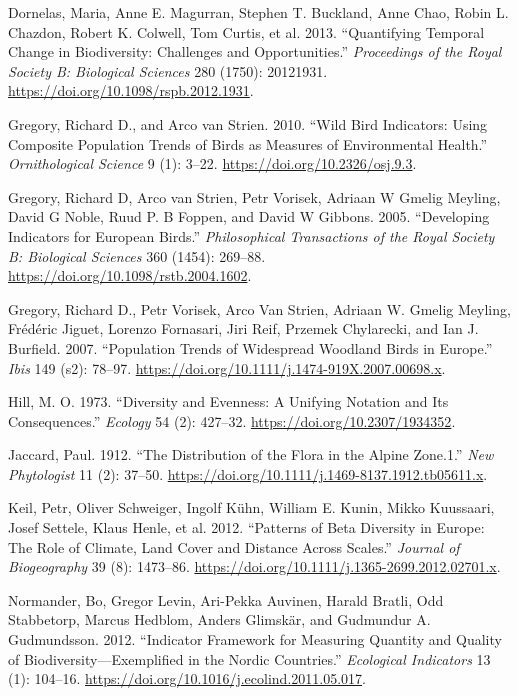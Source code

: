 \documentclass[
  12pt,
  oneside]{report}
\begin{document}
\leavevmode\hypertarget{ref-dornelas_quantifying_2013}{}%
Dornelas, Maria, Anne E. Magurran, Stephen T. Buckland, Anne Chao, Robin L. Chazdon, Robert K. Colwell, Tom Curtis, et al. 2013. ``Quantifying Temporal Change in Biodiversity: Challenges and Opportunities.'' \emph{Proceedings of the Royal Society B: Biological Sciences} 280 (1750): 20121931. \url{https://doi.org/10.1098/rspb.2012.1931}.

\leavevmode\hypertarget{ref-gregory_wild_2010}{}%
Gregory, Richard D., and Arco van Strien. 2010. ``Wild Bird Indicators: Using Composite Population Trends of Birds as Measures of Environmental Health.'' \emph{Ornithological Science} 9 (1): 3--22. \url{https://doi.org/10.2326/osj.9.3}.

\leavevmode\hypertarget{ref-gregory_developing_2005}{}%
Gregory, Richard D, Arco van Strien, Petr Vorisek, Adriaan W Gmelig Meyling, David G Noble, Ruud P. B Foppen, and David W Gibbons. 2005. ``Developing Indicators for European Birds.'' \emph{Philosophical Transactions of the Royal Society B: Biological Sciences} 360 (1454): 269--88. \url{https://doi.org/10.1098/rstb.2004.1602}.

\leavevmode\hypertarget{ref-gregory_population_2007}{}%
Gregory, Richard D., Petr Vorisek, Arco Van Strien, Adriaan W. Gmelig Meyling, Frédéric Jiguet, Lorenzo Fornasari, Jiri Reif, Przemek Chylarecki, and Ian J. Burfield. 2007. ``Population Trends of Widespread Woodland Birds in Europe.'' \emph{Ibis} 149 (s2): 78--97. \url{https://doi.org/10.1111/j.1474-919X.2007.00698.x}.

\leavevmode\hypertarget{ref-hill_diversity_1973}{}%
Hill, M. O. 1973. ``Diversity and Evenness: A Unifying Notation and Its Consequences.'' \emph{Ecology} 54 (2): 427--32. \url{https://doi.org/10.2307/1934352}.

\leavevmode\hypertarget{ref-jaccard_distribution_1912}{}%
Jaccard, Paul. 1912. ``The Distribution of the Flora in the Alpine Zone.1.'' \emph{New Phytologist} 11 (2): 37--50. \url{https://doi.org/10.1111/j.1469-8137.1912.tb05611.x}.

\leavevmode\hypertarget{ref-keil_patterns_2012}{}%
Keil, Petr, Oliver Schweiger, Ingolf Kühn, William E. Kunin, Mikko Kuussaari, Josef Settele, Klaus Henle, et al. 2012. ``Patterns of Beta Diversity in Europe: The Role of Climate, Land Cover and Distance Across Scales.'' \emph{Journal of Biogeography} 39 (8): 1473--86. \url{https://doi.org/10.1111/j.1365-2699.2012.02701.x}.

\leavevmode\hypertarget{ref-normander_indicator_2012}{}%
Normander, Bo, Gregor Levin, Ari-Pekka Auvinen, Harald Bratli, Odd Stabbetorp, Marcus Hedblom, Anders Glimskär, and Gudmundur A. Gudmundsson. 2012. ``Indicator Framework for Measuring Quantity and Quality of Biodiversity---Exemplified in the Nordic Countries.'' \emph{Ecological Indicators} 13 (1): 104--16. \url{https://doi.org/10.1016/j.ecolind.2011.05.017}.
\end{document}
